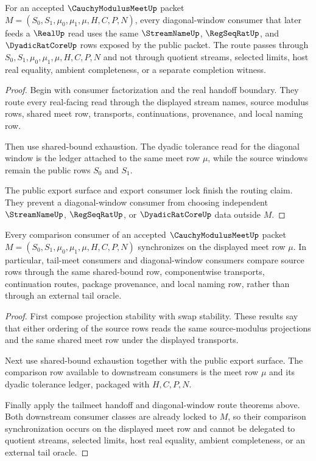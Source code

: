 \begin{theorem}
\label{thm:cauchy-modulus-meet-diagonal-window-route}
For an accepted $\CauchyModulusMeetUp$ packet $M=(S_0,S_1,\mu_0,\mu_1,\mu,H,C,P,N)$, every diagonal-window consumer that later feeds a $\RealUp$ read uses the same $\StreamNameUp$, $\RegSeqRatUp$, and $\DyadicRatCoreUp$ rows exposed by the public packet. The route passes through $S_0,S_1,\mu_0,\mu_1,\mu,H,C,P,N$ and not through quotient streams, selected limits, host real equality, ambient completeness, or a separate completion witness.
\end{theorem}
\begin{proof}
Begin with consumer factorization and the real handoff boundary. They route every real-facing read through the displayed stream names, source modulus rows, shared meet row, transports, continuations, provenance, and local naming row.

Then use shared-bound exhaustion. The dyadic tolerance read for the diagonal window is the ledger attached to the same meet row $\mu$, while the source windows remain the public rows $S_0$ and $S_1$.

The public export surface and export consumer lock finish the routing claim. They prevent a diagonal-window consumer from choosing independent $\StreamNameUp$, $\RegSeqRatUp$, or $\DyadicRatCoreUp$ data outside $M$.
\end{proof}

\begin{theorem}
\label{thm:cauchy-modulus-meet-comparison-synchronization}
Every comparison consumer of an accepted $\CauchyModulusMeetUp$ packet $M=(S_0,S_1,\mu_0,\mu_1,\mu,H,C,P,N)$ synchronizes on the displayed meet row $\mu$. In particular, tail-meet consumers and diagonal-window consumers compare source rows through the same shared-bound row, componentwise transports, continuation routes, package provenance, and local naming row, rather than through an external tail oracle.
\end{theorem}
\begin{proof}
First compose projection stability with swap stability. These results say that either ordering of the source rows reads the same source-modulus projections and the same shared meet row under the displayed transports.

Next use shared-bound exhaustion together with the public export surface. The comparison row available to downstream consumers is the meet row $\mu$ and its dyadic tolerance ledger, packaged with $H,C,P,N$.

Finally apply the tailmeet handoff and diagonal-window route theorems above. Both downstream consumer classes are already locked to $M$, so their comparison synchronization occurs on the displayed meet row and cannot be delegated to quotient streams, selected limits, host real equality, ambient completeness, or an external tail oracle.
\end{proof}

